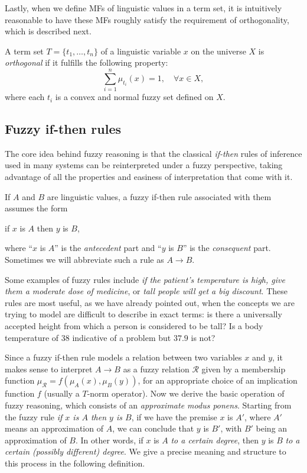 Lastly, when we define MFs of linguistic values in a term set, it is intuitively reasonable to have these MFs roughly satisfy the requirement of orthogonality, which is described next.

\begin{definition}[Orthogonality] A term set $T= \{t_1, \dots, t_n\}$ of a linguistic variable $x$ on the universe $X$ is \textit{orthogonal} if it fulfills the following property:
\[
\sum_{i=1}^n \mu_{t_i}(x) = 1, \quad \forall x \in X,
\]
where each $t_i$ is a convex and normal fuzzy set defined on $X$.
\end{definition}



\subsection{Fuzzy if-then rules}

The core idea behind fuzzy reasoning is that the classical \textit{if-then} rules of inference used in many systems can be reinterpreted under a fuzzy perspective, taking advantage of all the properties and easiness of interpretation that come with it.

\begin{definition} If $A$ and $B$ are linguistic values, a fuzzy if-then rule associated with them assumes the form
\begin{center}
  if $x$ is $A$ then $y$ is $B$,
\end{center}
where ``$x$ is $A$'' is the \textit{antecedent} part and ``$y$ is $B$'' is the \textit{consequent} part. Sometimes we will abbreviate such a rule as $A\to B$.
\end{definition}

Some examples of fuzzy rules include \textit{if the patient's temperature is high, give them a moderate dose of medicine}, or \textit{tall people will get a big discount}. These rules are most useful, as we have already pointed out, when the concepts we are trying to model are difficult to describe in exact terms: is there a universally accepted height from which a person is considered to be tall? Is a body temperature of 38\textdegree{} indicative of a problem but $37.9$\textdegree{} is not?

Since a fuzzy if-then rule models a relation between two variables $x$ and $y$, it makes sense to interpret $A\to B$ as a fuzzy relation $\mathcal R$ given by a membership function $\mu_{\mathcal R} = f(\mu_A(x), \mu_B(y))$, for an appropriate choice of an implication function $f$ (usually a $T$-norm operator). Now we derive the basic operation of fuzzy reasoning, which consists of an \textit{approximate modus ponens}. Starting from the fuzzy rule \textit{if $x$ is $A$ then $y$ is $B$}, if we have the premise $x$ is $A'$, where $A'$ means an approximation of $A$, we can conclude that $y$ is $B'$, with $B'$ being an approximation of $B$. In other words, if $x$ is $A$ \textit{to a certain degree}, then $y$ is $B$ \textit{to a certain (possibly different) degree}. We give a precise meaning and structure to this process in the following definition.


